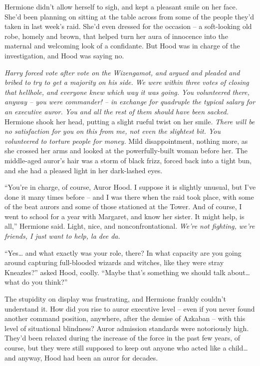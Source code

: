 Hermione didn't allow herself to sigh, and kept a pleasant smile on her
face. She'd been planning on sitting at the table across from some of
the people they'd taken in last week's raid. She'd even dressed for the
occasion -- a soft-looking old robe, homely and brown, that helped turn
her aura of innocence into the maternal and welcoming look of a
confidante. But Hood was in charge of the investigation, and Hood was
saying no.

\emph{Harry forced vote after vote on the Wizengamot, and argued and
pleaded and bribed to try to get a majority on his side. We were within
three votes of closing that hellhole, and everyone knew which way it was
going. You volunteered there, anyway -- you were commander! -- in
exchange for quadruple the typical salary for an executive auror. You
and all the rest of them should have been sacked.} Hermione shook her
head, putting a slight rueful twist on her smile. \emph{There will be no
satisfaction for you on this from me, not even the slightest bit. You
volunteered to torture people for money.} Mild disappointment, nothing
more, as she crossed her arms and looked at the powerfully-built woman
before her. The middle-aged auror's hair was a storm of black frizz,
forced back into a tight bun, and she had a pleased light in her
dark-lashed eyes.

``You're in charge, of course, Auror Hood. I suppose it is slightly
unusual, but I've done it many times before -- and I was there when the
raid took place, with some of the beat aurors and some of those
stationed at the Tower. And of course, I went to school for a year with
Margaret, and know her sister. It might help, is all,'' Hermione said.
Light, nice, and nonconfrontational. \emph{We're not fighting, we're
friends, I just want to help, la dee da.}

``Yes\ldots{} and what exactly was your role, there? In what capacity
are you going around capturing full-blooded wizards and witches, like
they were stray Kneazles?'' asked Hood, coolly. ``Maybe that's something
we should talk about\ldots{} what do you think?''

The stupidity on display was frustrating, and Hermione frankly couldn't
understand it. How did you rise to auror executive level -- even if you
never found another command position, anywhere, after the demise of
Azkaban -- with this level of situational blindness? Auror admission
standards were notoriously high. They'd been relaxed during the increase
of the force in the past few years, of course, but they were still
supposed to keep out anyone who acted like a child\ldots{} and anyway,
Hood had been an auror for decades.


